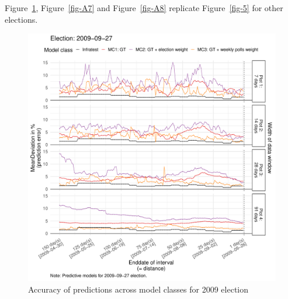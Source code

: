 \documentclass[
  letterpaper,
  DIV=11,
  numbers=noendperiod]{scrartcl}
\begin{document}
Figure~\ref{fig-A6}, Figure~\ref{fig-A7} and Figure~\ref{fig-A8}
replicate Figure~\ref{fig-5} for other elections.

\begin{figure}[H]

\caption{\label{fig-A6}Accuracy of predictions across model classes for
2009 election}

{\centering \includegraphics{figures/fig-A6-1.pdf}

}

\end{figure}
\end{document}

